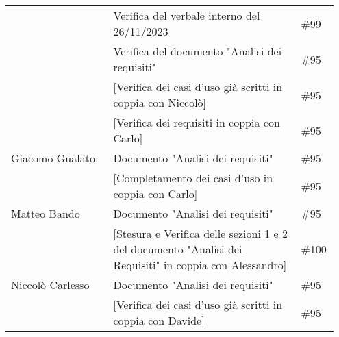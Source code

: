 \begin{center}
{\begin{tabular}{p{0.30\linewidth}|p{0.55\linewidth}|p{0.10\linewidth}}
			\cline{2-3}
			                                        & Verifica del verbale interno del 26/11/2023                                                             & \#99          \\
			\cline{2-3}
			                                        & Verifica del documento "Analisi dei requisiti"                                                          & \#95          \\
			\cline{2-3}
			                                        & [Verifica dei casi d'uso già scritti in coppia con Niccolò]                                             & \#95          \\
			\cline{2-3}
			                                        & [Verifica dei requisiti in coppia con Carlo]                                                            & \#95          \\ \hline
			Giacomo Gualato                         & Documento "Analisi dei requisiti"                                                                       & \#95          \\
			\cline{2-3}
			                                        & [Completamento dei casi d'uso in coppia con Carlo]                                                      & \#95          \\
			\hline
			Matteo Bando                            & Documento "Analisi dei requisiti"                                                                       & \#95          \\
			\cline{2-3}
			                                        & [Stesura e Verifica delle sezioni 1 e 2 del documento "Analisi dei Requisiti" in coppia con Alessandro] & \#100         \\
			\hline
			Niccolò Carlesso                        & Documento "Analisi dei requisiti"                                                                       & \#95          \\
			\cline{2-3}
			                                        & [Verifica dei casi d'uso già scritti in coppia con Davide]                                              & \#95          \\
			\hline
		\end{tabular}
	}
\end{center}
